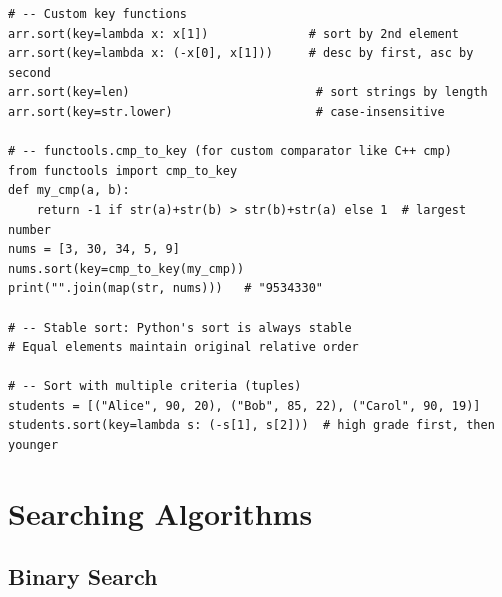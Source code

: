 \documentclass[11pt,a4paper]{report}
\begin{document}
\begin{lstlisting}
# -- Custom key functions
arr.sort(key=lambda x: x[1])              # sort by 2nd element
arr.sort(key=lambda x: (-x[0], x[1]))     # desc by first, asc by second
arr.sort(key=len)                          # sort strings by length
arr.sort(key=str.lower)                    # case-insensitive

# -- functools.cmp_to_key (for custom comparator like C++ cmp)
from functools import cmp_to_key
def my_cmp(a, b):
    return -1 if str(a)+str(b) > str(b)+str(a) else 1  # largest number
nums = [3, 30, 34, 5, 9]
nums.sort(key=cmp_to_key(my_cmp))
print("".join(map(str, nums)))   # "9534330"

# -- Stable sort: Python's sort is always stable
# Equal elements maintain original relative order

# -- Sort with multiple criteria (tuples)
students = [("Alice", 90, 20), ("Bob", 85, 22), ("Carol", 90, 19)]
students.sort(key=lambda s: (-s[1], s[2]))  # high grade first, then younger
\end{lstlisting}

\chapter{Searching Algorithms}

\section{Binary Search}
\end{document}
